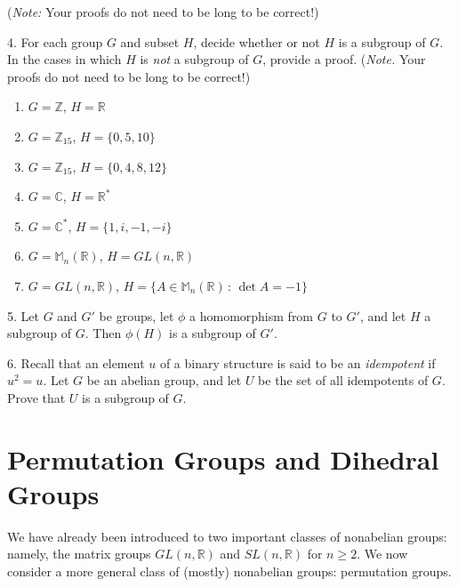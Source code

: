 \documentclass[10pt,]{book}
\theoremstyle{plain}
\theoremstyle{definition}
\theoremstyle{definition}
\theoremstyle{definition}
\theoremstyle{definition}
\numberwithin{equation}{section}
\def\Z{\mathbb{Z}}
\def\R{\mathbb{R}}
\def\C{\mathbb{C}}
\def\M{\mathbb{M}}
\begin{document}
\begin{exerciselist}
\begin{enumerate}[label=(\alph*)]
\end{enumerate}
%
\par
(\emph{Note:} Your proofs do not need to be long to be correct!)%
\par\smallskip
\item[4.]\hypertarget{exercise-38}{}For each group \(G\) and subset \(H\), decide whether or not \(H\) is a subgroup of \(G\). In the cases in which \(H\) is \emph{not} a subgroup of \(G\), provide a proof. (\emph{Note.} Your proofs do not need to be long to be correct!) \leavevmode%
\begin{enumerate}[label=(\alph*)]
\item\hypertarget{li-298}{}\(G=\Z\), \(H=\R\)%
\item\hypertarget{li-299}{}\(G=\Z_{15}\), \(H=\{0,5,10\}\)%
\item\hypertarget{li-300}{}\(G=\Z_{15}\), \(H=\{0,4,8,12\}\)%
\item\hypertarget{li-301}{}\(G=\C\), \(H=\R^*\)%
\item\hypertarget{li-302}{}\(G=\C^*\), \(H=\{1,i,-1,-i\}\)%
\item\hypertarget{li-303}{}\(G=\M_n(\R)\), \(H=GL(n,\R)\)%
\item\hypertarget{li-304}{}\(G=GL(n,\R)\), \(H=\{A\in \M_n(\R)\,:\,\det A = -1\}\)%
\end{enumerate}
%
\par\smallskip
\item[5.]\hypertarget{exercise-39}{}Let \(G\) and \(G'\) be groups, let \(\phi\) a homomorphism from \(G\) to \(G'\), and let \(H\) a subgroup of \(G\). Then \(\phi(H)\) is a subgroup of \(G'\).%
\par\smallskip
\item[6.]\hypertarget{exercise-40}{}Recall that an element \(u\) of a binary structure is said to be an \emph{idempotent} if \(u^2=u\). Let \(G\) be an abelian group, and let \(U\) be the set of all idempotents of \(G\). Prove that \(U\) is a subgroup of \(G\).%
\par\smallskip
\end{exerciselist}
\typeout{************************************************}
\typeout{************************************************}
\chapter[{Permutation Groups and Dihedral Groups}]{Permutation Groups and Dihedral Groups}\label{perm}
We have already been introduced to two important classes of nonabelian groups: namely, the matrix groups \(GL(n,\R)\) and \(SL(n,\R)\) for \(n\geq 2\). We now consider a more general class of (mostly) nonabelian groups: permutation groups.%
\typeout{************************************************}
\typeout{************************************************}
\end{document}
